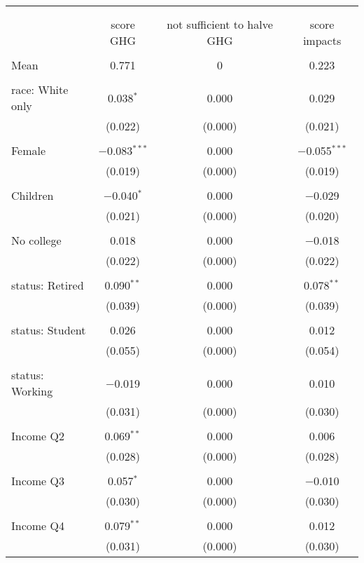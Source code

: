 
\begin{tabular}{@{\extracolsep{5pt}}lccc} 
\\[-1.8ex]\hline 
\hline \\[-1.8ex] 
\\[-1.8ex] & score GHG & not sufficient to halve GHG & score impacts \\ 
\hline \\[-1.8ex] 
 Mean & 0.771 & 0 & 0.223  \\ \hline \\[-1.8ex] race: White only & 0.038$^{*}$ & 0.000 & 0.029 \\ 
  & (0.022) & (0.000) & (0.021) \\ 
  & & & \\ 
 Female & $-$0.083$^{***}$ & 0.000 & $-$0.055$^{***}$ \\ 
  & (0.019) & (0.000) & (0.019) \\ 
  & & & \\ 
 Children & $-$0.040$^{*}$ & 0.000 & $-$0.029 \\ 
  & (0.021) & (0.000) & (0.020) \\ 
  & & & \\ 
 No college & 0.018 & 0.000 & $-$0.018 \\ 
  & (0.022) & (0.000) & (0.022) \\ 
  & & & \\ 
 status: Retired & 0.090$^{**}$ & 0.000 & 0.078$^{**}$ \\ 
  & (0.039) & (0.000) & (0.039) \\ 
  & & & \\ 
 status: Student & 0.026 & 0.000 & 0.012 \\ 
  & (0.055) & (0.000) & (0.054) \\ 
  & & & \\ 
 status: Working & $-$0.019 & 0.000 & 0.010 \\ 
  & (0.031) & (0.000) & (0.030) \\ 
  & & & \\ 
 Income Q2 & 0.069$^{**}$ & 0.000 & 0.006 \\ 
  & (0.028) & (0.000) & (0.028) \\ 
  & & & \\ 
 Income Q3 & 0.057$^{*}$ & 0.000 & $-$0.010 \\ 
  & (0.030) & (0.000) & (0.030) \\ 
  & & & \\ 
 Income Q4 & 0.079$^{**}$ & 0.000 & 0.012 \\ 
  & (0.031) & (0.000) & (0.030) \\ 

\end{tabular}
